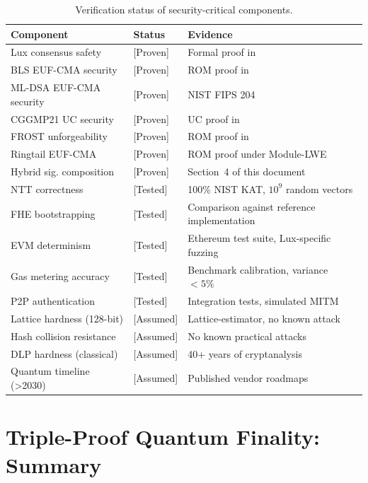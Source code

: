 \documentclass[11pt,a4paper]{article}
\begin{document}
\begin{table}[ht]
\centering
\caption{Verification status of security-critical components.}
\label{tab:verification}
\begin{tabular}{p{3.5cm}lp{4cm}}
\toprule
\textbf{Component} & \textbf{Status} & \textbf{Evidence} \\
\midrule
Lux consensus safety & [Proven] & Formal proof in~\cite{rocket2020scalable} \\
BLS EUF-CMA security & [Proven] & ROM proof in~\cite{boneh2001bls} \\
ML-DSA EUF-CMA security & [Proven] & NIST FIPS 204~\cite{fips204} \\
CGGMP21 UC security & [Proven] & UC proof in~\cite{canetti2021uc} \\
FROST unforgeability & [Proven] & ROM proof in~\cite{komlo2020frost} \\
Ringtail EUF-CMA & [Proven] & ROM proof under Module-LWE \\
Hybrid sig. composition & [Proven] & Section~4 of this document \\
NTT correctness & [Tested] & 100\% NIST KAT, $10^9$ random vectors \\
FHE bootstrapping & [Tested] & Comparison against reference implementation \\
EVM determinism & [Tested] & Ethereum test suite, Lux-specific fuzzing \\
Gas metering accuracy & [Tested] & Benchmark calibration, variance $< 5\%$ \\
P2P authentication & [Tested] & Integration tests, simulated MITM \\
Lattice hardness (128-bit) & [Assumed] & Lattice-estimator, no known attack \\
Hash collision resistance & [Assumed] & No known practical attacks \\
DLP hardness (classical) & [Assumed] & 40+ years of cryptanalysis \\
Quantum timeline (>2030) & [Assumed] & Published vendor roadmaps \\
\bottomrule
\end{tabular}
\end{table}

\section{Triple-Proof Quantum Finality: Summary}
\label{sec:triple-proof}
\end{document}
